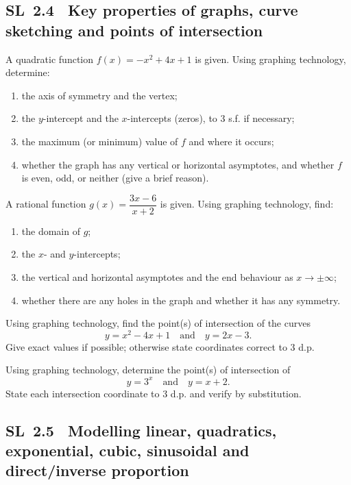 \documentclass[11pt]{article}
\newcommand{\tocsubsection}[1]{\subsection{#1}}
\newcounter{question}
\begin{document}
\tocsubsection{SL 2.4 \; Key properties of graphs, curve sketching and points of intersection}

\begin{question}
A quadratic function $f(x)=-x^{2}+4x+1$ is given. Using graphing technology, determine:
\begin{enumerate}
  \item the axis of symmetry and the vertex;
  \item the $y$-intercept and the $x$-intercepts (zeros), to 3 s.f. if necessary;
  \item the maximum (or minimum) value of $f$ and where it occurs;
  \item whether the graph has any vertical or horizontal asymptotes, and whether $f$ is even, odd, or neither (give a brief reason).
\end{enumerate}
\end{question}

\begin{question}
A rational function $g(x)=\dfrac{3x-6}{x+2}$ is given. Using graphing technology, find:
\begin{enumerate}
  \item the domain of $g$;
  \item the $x$- and $y$-intercepts;
  \item the vertical and horizontal asymptotes and the end behaviour as $x\to\pm\infty$;
  \item whether there are any holes in the graph and whether it has any symmetry.
\end{enumerate}
\end{question}

\begin{question}
Using graphing technology, find the point(s) of intersection of the curves
\[
y=x^{2}-4x+1 \quad\text{and}\quad y=2x-3.
\]
Give exact values if possible; otherwise state coordinates correct to 3 d.p.
\end{question}

\begin{question}
Using graphing technology, determine the point(s) of intersection of
\[
y=3^{x} \quad\text{and}\quad y=x+2.
\]
State each intersection coordinate to 3 d.p. and verify by substitution.
\end{question}









\tocsubsection{SL 2.5 \;  Modelling linear, quadratics, exponential, cubic, sinusoidal and direct/inverse proportion}
\end{document}
